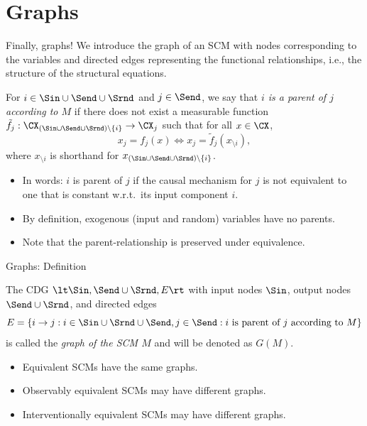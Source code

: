 \part{Graphs}
\frame{\partpage}

\begin{frame}{Finally, graphs!}
  We introduce the graph of an SCM with nodes corresponding to the variables and directed edges representing the functional relationships, i.e., the structure of the structural equations.
  
  \begin{Def}[\ref{def:scm_parent}]
  For $i \in \Sin \cup \Send \cup \Srnd$ and $j \in \Send$, we say that
  \emph{$i$ is a parent of $j$ according to $M$} if there does not exist a measurable function
  $\tilde f_j : \CX_{(\Sin\cup\Send\cup\Srnd) \setminus \{i\}} \to \CX_j$
  such that for all $x \in \CX$,
  $$x_j = f_j(x) \iff x_j = \tilde f_j(x_{\setminus i}),$$
  where $x_{\setminus i}$ is shorthand for $x_{(\Sin\cup\Send\cup\Srnd)\setminus\{i\}}$.
\end{Def}
  \begin{itemize}
    \item In words: $i$ is parent of $j$ if the causal mechanism for $j$ is not equivalent to one that is constant w.r.t.\ its input component $i$.
    \item By definition, exogenous (input and random) variables have no parents.
    \item Note that the parent-relationship is preserved under equivalence.
  \end{itemize}
\end{frame}

\begin{frame}{Graphs: Definition}
  \begin{Def}[\ref{def:scm_graph}]
  The CDG $\lt \Sin, \Send \cup \Srnd, E \rt$ with
  input nodes $\Sin$, output nodes $\Send\cup\Srnd$, and
  directed edges
  $$E = \{i \to j : i \in \Sin\cup\Srnd\cup\Send, j\in\Send: \text{$i$ is parent of $j$ according to $M$}\}$$
  is called the \emph{graph of the SCM $M$} and will be denoted as $G(M)$.
\end{Def}
  \begin{itemize}
    \item Equivalent SCMs have the same graphs.
    \item Observably equivalent SCMs may have different graphs.
    \item Interventionally equivalent SCMs may have different graphs.
  \end{itemize}
\end{frame}

